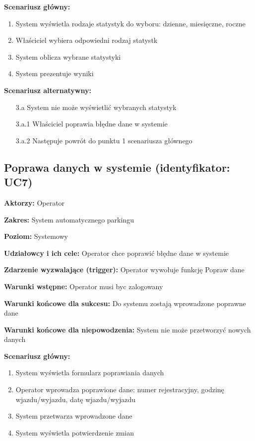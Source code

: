 \hspace{0cm}\textbf{Scenariusz główny: }
\begin{enumerate}
\item System wyświetla rodzaje statystyk do wyboru: dzienne, miesięczne, roczne
\item Właściciel wybiera odpowiedni rodzaj statystk
\item System oblicza wybrane statystyki
\item System prezentuje wyniki
\end{enumerate}
\hspace{0cm}\textbf{Scenariusz alternatywny: }
\begin{enumerate}
\item[3.a] System nie może wyświetlić wybranych statystyk
\item[3.a.1] Właściciel poprawia błędne dane w systemie
\item[3.a.2] Następuje powrót do punktu 1 scenariusza głównego
\end{enumerate}

\subsection{Poprawa danych w systemie (identyfikator: UC7)}
\textbf{Aktorzy: }Operator

\hspace{0cm}\textbf{Zakres: }System automatycznego parkingu

\hspace{0cm}\textbf{Poziom: }Systemowy

\hspace{0cm}\textbf{Udziałowcy i ich cele: }Operator chce poprawić błędne dane w systemie

\hspace{0cm}\textbf{Zdarzenie wyzwalające (trigger): }Operator wywołuje funkcję Popraw dane

\hspace{0cm}\textbf{Warunki wstępne: }
Operator musi byc zalogowany

\hspace{0cm}\textbf{Warunki końcowe dla sukcesu: }Do systemu zostają wprowadzone poprawne dane

\hspace{0cm}\textbf{Warunki końcowe dla niepowodzenia: }System nie może przetworzyć nowych danych\newline

\hspace{0cm}\textbf{Scenariusz główny: }
\begin{enumerate}
\item System wyświetla formularz poprawiania danych
\item Operator wprowadza poprawione dane: numer rejestracyjny, godzinę wjazdu/wyjazdu, datę wjazdu/wyjazdu
\item System przetwarza wprowadzone dane
\item System wyświetla potwierdzenie zmian
\end{enumerate}

